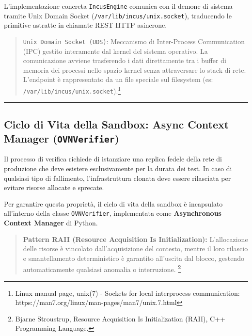 L'implementazione concreta \passthrough{\lstinline!IncusEngine!}
comunica con il demone di sistema tramite Unix Domain Socket
(\passthrough{\lstinline!/var/lib/incus/unix.socket!}), traducendo le
primitive astratte in chiamate REST HTTP asincrone.

\begin{quote}
\passthrough{\lstinline!Unix Domain Socket (UDS)!}: Meccanismo di
Inter-Process Communication (IPC) gestito interamente dal kernel del
sistema operativo. La comunicazione avviene trasferendo i dati
direttamente tra i buffer di memoria dei processi nello spazio kernel
senza attraversare lo stack di rete. L'endpoint è rappresentato da un
file speciale sul filesystem (es:
\passthrough{\lstinline!/var/lib/incus/unix.socket!}).\footnote{\label{fn:ref_21}Linux
  manual page, unix(7) - Sockets for local interprocess communication:
  https://man7.org/linux/man-pages/man7/unix.7.html}
\end{quote}

\begin{center}\rule{0.5\linewidth}{0.5pt}\end{center}

\subsection{\texorpdfstring{Ciclo di Vita della Sandbox: Async Context
Manager
(\texttt{OVNVerifier})}{Ciclo di Vita della Sandbox: Async Context Manager (OVNVerifier)}}\label{ciclo-di-vita-della-sandbox-async-context-manager-ovnverifier}

Il processo di verifica richiede di istanziare una replica fedele della
rete di produzione che deve esistere esclusivamente per la durata dei
test. In caso di qualsiasi tipo di fallimento, l'infrastruttura clonata
deve essere rilasciata per evitare risorse allocate e sprecate.

Per garantire questa proprietà, il ciclo di vita della sandbox è
incapsulato all'interno della classe
\passthrough{\lstinline!OVNVerifier!}, implementata come
\textbf{Asynchronous Context Manager} di Python.

\begin{quote}
\textbf{Pattern RAII (Resource Acquisition Is Initialization):}
L'allocazione delle risorse è vincolato dall'acquisizione del contesto,
mentre il loro rilascio e smantellamento deterministico è garantito
all'uscita dal blocco, gestendo automaticamente qualsiasi anomalia o
interruzione. \footnote{\label{fn:ref_22}Bjarne Stroustrup, Resource Acquisition Is
  Initialization (RAII), C++ Programming Language.}
\end{quote}

